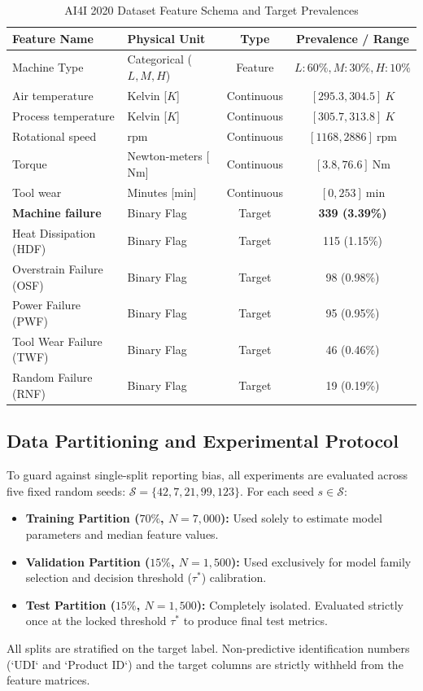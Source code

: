 \documentclass[conference]{IEEEtran}
\begin{document}
\begin{table}[h]
\caption{AI4I 2020 Dataset Feature Schema and Target Prevalences}
\centering
\begin{tabular}{llcc}
\toprule
\textbf{Feature Name} & \textbf{Physical Unit} & \textbf{Type} & \textbf{Prevalence / Range} \\
\midrule
Machine Type & Categorical ($L, M, H$) & Feature & $L: 60\%, M: 30\%, H: 10\%$ \\
Air temperature & Kelvin [$K$] & Continuous & $[295.3, 304.5]\ K$ \\
Process temperature & Kelvin [$K$] & Continuous & $[305.7, 313.8]\ K$ \\
Rotational speed & rpm & Continuous & $[1168, 2886]\ \text{rpm}$ \\
Torque & Newton-meters [$\text{Nm}$] & Continuous & $[3.8, 76.6]\ \text{Nm}$ \\
Tool wear & Minutes [$\text{min}$] & Continuous & $[0, 253]\ \text{min}$ \\
\midrule
\textbf{Machine failure} & Binary Flag & Target & \textbf{339 (3.39\%)} \\
Heat Dissipation (HDF) & Binary Flag & Target & 115 (1.15\%) \\
Overstrain Failure (OSF) & Binary Flag & Target & 98 (0.98\%) \\
Power Failure (PWF) & Binary Flag & Target & 95 (0.95\%) \\
Tool Wear Failure (TWF) & Binary Flag & Target & 46 (0.46\%) \\
Random Failure (RNF) & Binary Flag & Target & 19 (0.19\%) \\
\bottomrule
\end{tabular}
\label{tab:dataset}
\end{table}

\subsection{Data Partitioning and Experimental Protocol}
To guard against single-split reporting bias, all experiments are evaluated across five fixed random seeds: $\mathcal{S} = \{42, 7, 21, 99, 123\}$. For each seed $s \in \mathcal{S}$:
\begin{itemize}
    \item \textbf{Training Partition ($70\%$, $N=7,000$):} Used solely to estimate model parameters and median feature values.
    \item \textbf{Validation Partition ($15\%$, $N=1,500$):} Used exclusively for model family selection and decision threshold ($\tau^*$) calibration.
    \item \textbf{Test Partition ($15\%$, $N=1,500$):} Completely isolated. Evaluated strictly once at the locked threshold $\tau^*$ to produce final test metrics.
\end{itemize}
All splits are stratified on the target label. Non-predictive identification numbers (`UDI` and `Product ID`) and the target columns are strictly withheld from the feature matrices.
\end{document}
